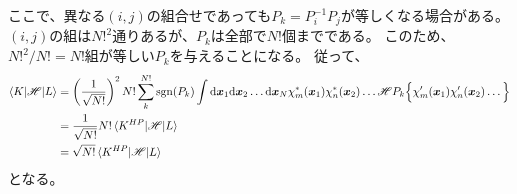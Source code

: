ここで、異なる$(i,j)$の組合せであっても$P_k=P_i^{-1}P_j$が等しくなる場合がある。
$(i,j)$の組は$N!^2$通りあるが、$P_k$は全部で$N!$個までである。
このため、$N!^2/N!=N!$組が等しい$P_k$を与えることになる。
従って、
\begin{align}
	\braket{K|\H|L}
&=
	\left(
		\frac{1}{\sqrt{N!}}
	\right)^2
	N!
	\sum_k^{N!}
		\sgn(P_k)
		\int \d\x_1\d\x_2\dots\d\x_N
			\chi_m^\ast(\x_1) \chi_n^\ast(\x_2) \dots
			\H
			P_k\Bigl\{
				\chi_m'(\x_1) \chi_n'(\x_2) \dots
			\Bigr\} \\
%
%
&=
	\frac{1}{\sqrt{N!}}
	N!
	\braket{K^{HP}|\H|L} \\
%
%
&=
	\sqrt{N!}
	\braket{K^{HP}|\H|L}
\end{align}
となる。



